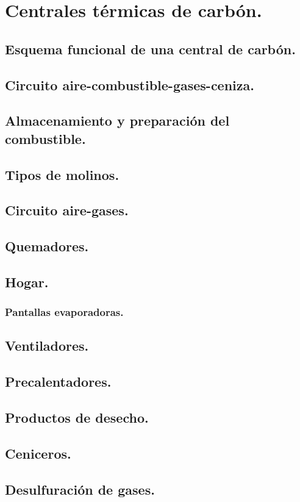 \chapter{Centrales térmicas de carbón.}
\section{Esquema funcional de una central de carbón.}
\section{Circuito aire-combustible-gases-ceniza.}
\section{Almacenamiento y preparación del combustible.}
\section{Tipos de molinos.}
\section{Circuito aire-gases.}
\section{Quemadores.}
\section{Hogar.}

\subsection{Pantallas evaporadoras.}
\section{Ventiladores.}
\section{Precalentadores.}
\section{Productos de desecho.}
\section{Ceniceros.}
\section{Desulfuración de gases.}
